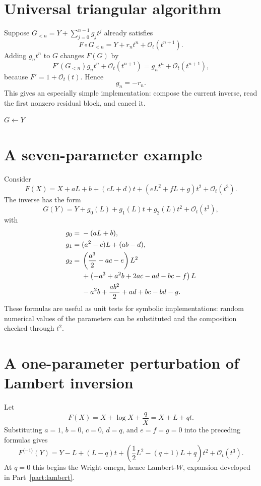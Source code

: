 \documentclass[11pt,oneside]{book}
\theoremstyle{definition}
\theoremstyle{remark}
\newcommand{\bigO}{\mathcal O}
\newcommand{\compinv}{^{\langle-1\rangle}}
\newcommand{\compose}{\mathbin{\circ}}
\begin{document}
\section{Universal triangular algorithm}
Suppose $G_{<n}=Y+\sum_{j=0}^{n-1}g_jt^j$ already satisfies
\[
 F\compose G_{<n}=Y+r_nt^n+\bigO_t(t^{n+1}).
\]
Adding $g_nt^n$ to $G$ changes $F(G)$ by
\[
 F'(G_{<n})g_nt^n+\bigO_t(t^{n+1})
 =g_nt^n+\bigO_t(t^{n+1}),
\]
because $F'=1+\bigO_t(t)$.  Hence
\begin{equation}\label{eq:triangular-next-block}
 g_n=-r_n.
\end{equation}
This gives an especially simple implementation: compose the current inverse,
read the first nonzero residual block, and cancel it.

\begin{algorithm}[H]
\caption{Residual-cancellation series reversal}
\label{alg:triangular-reversal}
\KwOut{$G=F\compinv\pmod{t^{N+1}}$}
$G\leftarrow Y$\;
\For{$n\leftarrow0$ \KwTo $N$}{
  $R\leftarrow F\compose G-Y\pmod{t^{n+1}}$\;
  $r_n\leftarrow[t^n]R$\;
  $G\leftarrow G-r_nt^n$\;
}
\;
\end{algorithm}

\section{A seven-parameter example}
Consider
\begin{equation}\label{eq:parametric-F}
 F(X)=X+aL+b+(cL+d)t+(eL^2+fL+g)t^2+\bigO_t(t^3).
\end{equation}
The inverse has the form
\[
 G(Y)=Y+g_0(L)+g_1(L)t+g_2(L)t^2+\bigO_t(t^3),
\]
with
\begin{align}
 g_0={}&-(aL+b),\label{eq:param-g0}\\
 g_1={}&(a^2-c)L+(ab-d),\label{eq:param-g1}\\
 g_2={}&\left(\frac{a^3}{2}-ac-e\right)L^2\notag\\
 &+\left(-a^3+a^2b+2ac-ad-bc-f\right)L\notag\\
 &-a^2b+\frac{ab^2}{2}+ad+bc-bd-g.
 \label{eq:param-g2}
\end{align}
These formulas are useful as unit tests for symbolic implementations: random
numerical values of the parameters can be substituted and the composition
checked through $t^2$.

\section{A one-parameter perturbation of Lambert inversion}
Let
\begin{equation}\label{eq:F-log-q}
 F(X)=X+\log X+\frac{q}{X}=X+L+qt.
\end{equation}
Substituting $a=1$, $b=0$, $c=0$, $d=q$, and $e=f=g=0$ into the preceding
formulas gives
\begin{equation}\label{eq:inverse-log-q}
 F\compinv(Y)
 =Y-L+(L-q)t
 +\left(\frac12L^2-(q+1)L+q\right)t^2
 +\bigO_t(t^3).
\end{equation}
At $q=0$ this begins the Wright omega, hence Lambert-$W$, expansion developed
in Part~\ref{part:lambert}.
\end{document}
